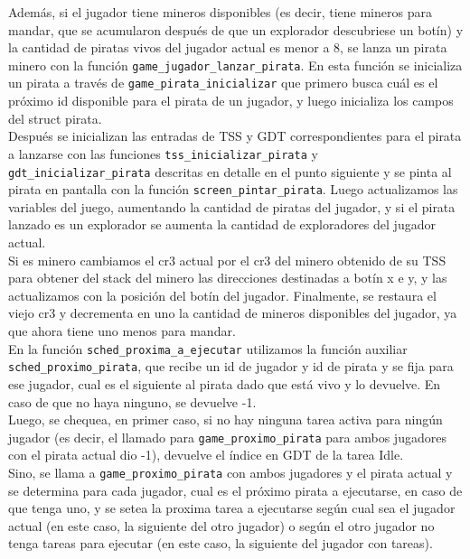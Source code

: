 Además, si el jugador tiene mineros disponibles (es decir, tiene mineros para mandar, que se acumularon después de que un explorador descubriese un botín) y la cantidad de piratas vivos del jugador actual es menor a 8, se lanza un pirata minero con la función \texttt{game\_jugador\_lanzar\_pirata}. En esta función se inicializa un pirata a través de \texttt{game\_pirata\_inicializar} que primero busca cuál es el próximo id disponible para el pirata de un jugador, y luego inicializa los campos del struct pirata.\\

Después se inicializan las entradas de TSS y GDT correspondientes para el pirata a lanzarse con las funciones \texttt{tss\_inicializar\_pirata} y \texttt{gdt\_inicializar\_pirata} descritas en detalle en el punto siguiente y se pinta al pirata en pantalla con la función \texttt{screen\_pintar\_pirata}.
Luego actualizamos las variables del juego, aumentando la cantidad de piratas del jugador, y si el pirata lanzado es un explorador se aumenta la cantidad de exploradores del jugador actual.\\

Si es minero cambiamos el cr3 actual por el cr3 del minero obtenido de su TSS para obtener del stack del minero las direcciones destinadas a botín x e y, y las actualizamos con la posición del botín del jugador.
Finalmente, se restaura el viejo cr3 y decrementa en uno la cantidad de mineros disponibles del jugador, ya que ahora tiene uno menos para mandar.\\


En la función \texttt{sched\_proxima\_a\_ejecutar} utilizamos la función auxiliar \texttt{sched\_proximo\_pirata}, que recibe un id de jugador y id de pirata y se fija para ese jugador, cual es el siguiente al pirata dado que está vivo y lo devuelve. En caso de que no haya ninguno, se devuelve -1.\\

Luego, se chequea, en primer caso, si no hay ninguna tarea activa para ningún jugador (es decir, el llamado para \texttt{game\_proximo\_pirata} para ambos jugadores con el pirata actual dio -1), devuelve el índice en GDT de la tarea Idle.\\

Sino, se llama a \texttt{game\_proximo\_pirata} con ambos jugadores y el pirata actual y se determina para cada jugador, cual es el próximo pirata a ejecutarse, en caso de que tenga uno, y se setea la proxima tarea a ejecutarse según cual sea el jugador actual (en este caso, la siguiente del otro jugador) o según el otro jugador no tenga tareas para ejecutar (en este caso, la siguiente del jugador con tareas). \\


